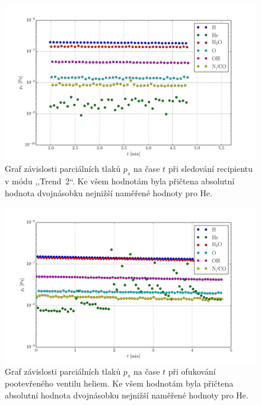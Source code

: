 \documentclass[english]{article}
\begin{document}
\begin{figure}[h!]
	\begin{center}
		\vspace*{-1cm}
		\includegraphics[width=\linewidth]{../plt/05_trend.pdf}
		\vspace*{-0,8cm}
		\caption{Graf závislosti parciálních tlaků $p_s$ na čase $t$ při sledování recipientu v módu ,,Trend~2``. Ke všem hodnotám byla přičtena absolutní hodnota dvojnásobku nejnižší naměřené hodnoty pro $\mathrm{He}$.}
		\label{fig:g_trend}
	\end{center}
\end{figure}

\begin{figure}[h!]
	\begin{center}
		\vspace*{-1.5cm}
		\includegraphics[width=\linewidth]{../plt/06_foukani.pdf}
		\vspace*{-0.8cm}
		\caption{Graf závislosti parciálních tlaků $p_s$ na čase $t$ při ofukování pootevřeného ventilu heliem. Ke všem hodnotám byla přičtena absolutní hodnota dvojnásobku nejnižší naměřené hodnoty pro $\mathrm{He}$. } %
		\label{fig:g_foukani}
	\end{center}
\end{figure}
\end{document}
